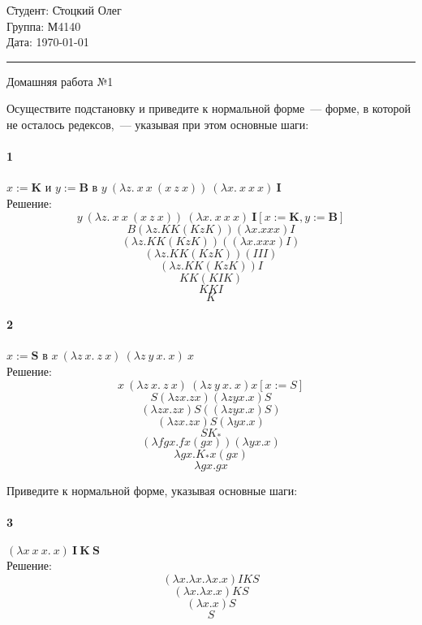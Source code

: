 \documentclass[12pt, a4paper] {article}
\begin{document}
\frenchspacing
\pagestyle{empty}

\begin{tabbing}
\hspace{11cm} \= Студент: \= Стоцкий Олег \\
  \> Группа: \> М4140 \\
  \> Дата: \> \today
\end{tabbing}
\hrule
\vspace{1cm}

\begin{center}
Домашняя работа №1
\end{center}

Осуществите подстановку и приведите к нормальной форме~--- форме, в которой не
осталось редексов,~--- указывая при этом основные шаги:

\paragraph{1} $x := \mathbf{K}$ и $y := \mathbf{B}$ в
    $y~(\lambda z.~x~x~(x~z~x))~(\lambda x.~x~x~x)~\mathbf{I}$\\
Решение:
    		$$y~(\lambda z.~x~x~(x~z~x))~(\lambda x.~x~x~x)~\mathbf{I} [x := \mathbf{K}, y := \mathbf{B}]$$
		$$B(\lambda z. KK(KzK))(\lambda x.xxx)I $$
        $$ (\lambda z.KK(KzK))((\lambda x.xxx)I)$$
        $$ (\lambda z.KK(KzK))(III) $$
        $$ (\lambda z.KK(KzK))I $$
        $$ KK(KIK) $$
        $$ KKI $$
        $$ K $$
\paragraph{2}$x := \mathbf{S}$ в
    $x~(\lambda z~x.~z~x)~(\lambda z~y~x.~x)~x$ \\
Решение:
   $$x~(\lambda z~x.~z~x)~(\lambda z~y~x.~x)x [x := S]$$
   $$ S(\lambda zx.zx)(\lambda zyx.x)S $$
   $$ (\lambda zx.zx) S ((\lambda zyx.x) S) $$
   $$ (\lambda zx.zx) S (\lambda yx.x)  $$
   $$ S K_* $$
   $$ (\lambda fgx. f x (g x))(\lambda yx.x) $$
   $$ \lambda gx. K_* x (g x) $$
   $$ \lambda gx. gx $$
   

Приведите к нормальной форме, указывая основные шаги:

\paragraph{3}$(\lambda x~x~x .~x)~\mathbf{I}~\mathbf{K}~\mathbf{S}$ \\
Решение:
	$$ (\lambda x.\lambda x. \lambda x.x) I K S $$
	$$ (\lambda x. \lambda x.x) K S $$
	$$ (\lambda x. x) S $$
	$$ S $$
\end{document}
